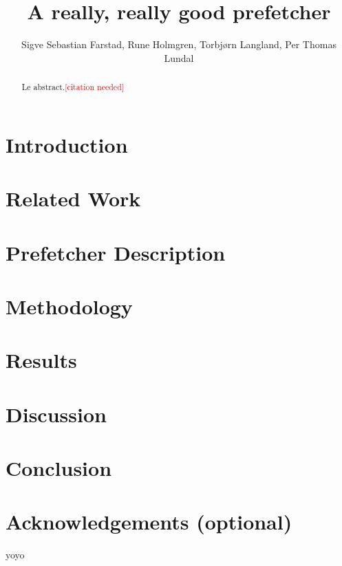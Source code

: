 \documentclass[a4paper]{IEEEtran}
\title{A really, really good prefetcher}
\author{
    Sigve Sebastian Farstad,
    Rune Holmgren,
    Torbjørn Langland,
    Per Thomas Lundal
}
\newcommand\cn{\textcolor{red}{[citation needed]}}
\begin{document}
\maketitle

\begin{abstract}
    Le abstract.\cn
\end{abstract}

\section{Introduction}
\section{Related Work}
\section{Prefetcher Description}
\section{Methodology}
\section{Results}
\section{Discussion}
\section{Conclusion}
\section{Acknowledgements (optional)}

yoyo \cite{assignment-text}



\nocite{*}
\end{document}
